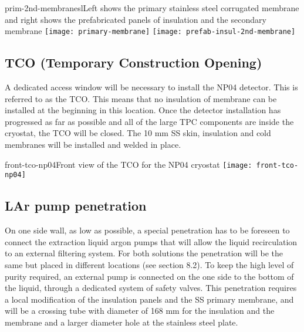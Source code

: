 \begin{cdrfigure}{prim-2nd-membranes}{lLeft shows the primary stainless steel corrugated membrane and right shows the prefabricated panels of insulation and the secondary membrane}
  \texttt{[image: primary-membrane]}
  \texttt{[image: prefab-insul-2nd-membrane]}
\end{cdrfigure}

\subsection{TCO (Temporary Construction Opening)}

A dedicated access window will be necessary to install the NP04 detector.  This is referred to as the TCO.  This means that no insulation of membrane can be installed at the beginning in this location. Once the detector installation has progressed as far as possible and all of the large TPC components are inside the cryostat, the TCO will be closed.  The 10 mm SS skin, insulation and cold membranes will be installed and welded in place. 

\begin{cdrfigure}{front-tco-np04}{Front view of the TCO for the NP04 cryostat}
  \texttt{[image: front-tco-np04]}
\end{cdrfigure}


\subsection{LAr pump penetration}

On one side wall, as low as possible, a special penetration has to be foreseen to connect the extraction liquid argon pumps that will allow the liquid recirculation to an external filtering system. For both solutions the penetration will be the same but placed in different locations (see section 8.2).
To keep the high level of purity required, an external pump is connected on the one side to the bottom of the liquid, through a dedicated system of safety valves. This penetration requires a local modification of the insulation panels and the SS primary membrane, and will be a crossing tube with diameter of 168 mm for the insulation and the membrane and a larger diameter hole at the stainless steel plate.

